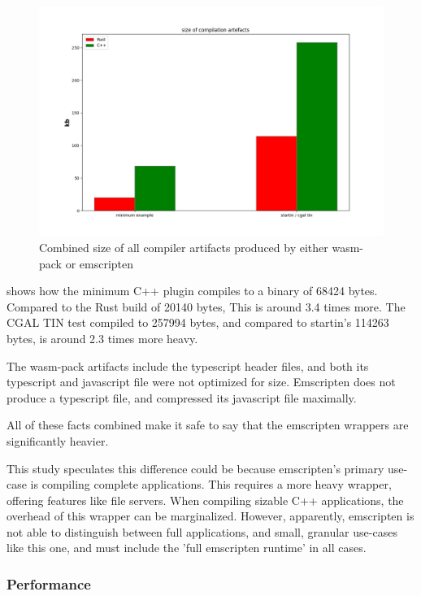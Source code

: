 \begin{figure}
  \graphicspath{{../../assets/plots/rust-cpp-performance/}}
  \centering
  \includegraphics[width=\linewidth]{figure.png}
  \caption[]{Combined size of all compiler artifacts produced by either wasm-pack or emscripten}
  \label{fig:rust-cpp-compilation}
\end{figure}

 shows how the minimum C++ plugin compiles to a binary of 68424 bytes. 
Compared to the Rust build of 20140 bytes, This is around 3.4 times more. 
The CGAL TIN test compiled to 257994 bytes, and compared to startin's 114263 bytes, is around 2.3 times more heavy.

The wasm-pack artifacts include the typescript header files, and both its typescript and javascript file were not optimized for size.
Emscripten does not produce a typescript file, and compressed its javascript file maximally. 

All of these facts combined make it safe to say that the emscripten wrappers are significantly heavier.

This study speculates this difference could be because emscripten's primary use-case is compiling complete applications. 
This requires a more heavy wrapper, offering features like file servers. 
When compiling sizable C++ applications, the overhead of this wrapper can be marginalized.
However, apparently, emscripten is not able to distinguish between full applications, and small, granular use-cases like this one, and must include the 'full emscripten runtime' in all cases.

\subsubsection*{Performance}

